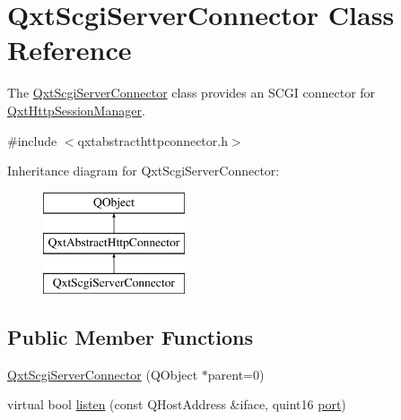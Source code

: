 \hypertarget{class_qxt_scgi_server_connector}{\section{Qxt\-Scgi\-Server\-Connector Class Reference}
\label{class_qxt_scgi_server_connector}
}


The \hyperlink{class_qxt_scgi_server_connector}{Qxt\-Scgi\-Server\-Connector} class provides an S\-C\-G\-I connector for \hyperlink{class_qxt_http_session_manager}{Qxt\-Http\-Session\-Manager}.  




{\ttfamily \#include $<$qxtabstracthttpconnector.\-h$>$}

Inheritance diagram for Qxt\-Scgi\-Server\-Connector\-:\begin{figure}[H]
\begin{center}
\leavevmode
\includegraphics[height=3.000000cm]{class_qxt_scgi_server_connector}
\end{center}
\end{figure}
\subsection*{Public Member Functions}
\begin{DoxyCompactItemize}
\item 
\hyperlink{class_qxt_scgi_server_connector_a2d38aba1052f4c8f8eb4a4b33a9f9bbb}{Qxt\-Scgi\-Server\-Connector} (Q\-Object $\ast$parent=0)
\item 
virtual bool \hyperlink{class_qxt_scgi_server_connector_a78611d3a99b6cc1c20d3dad9f5bdd57f}{listen} (const Q\-Host\-Address \&iface, quint16 \hyperlink{classport}{port})
\end{DoxyCompactItemize}
